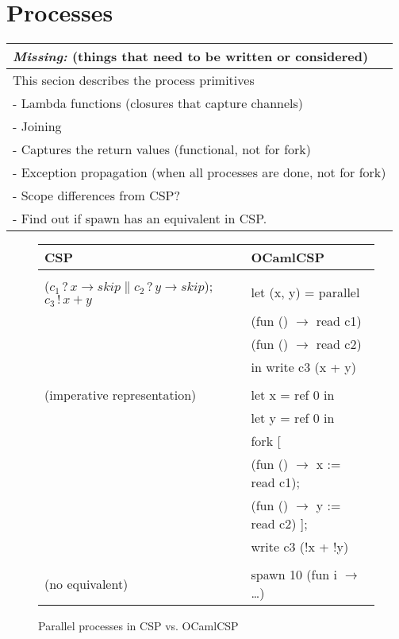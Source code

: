 \documentclass[11pt,oneside,a4paper]{article}
\newcommand{\missing}[1]{
\begin{tabular}{|p{11cm}|}
\hline
\emph{Missing:} {\scriptsize (things that need to be written or considered)} \\
\hline
#1
\hline
\end{tabular}
}
\begin{document}
\section{Processes}
\missing{
This secion describes the process primitives \\
- Lambda functions (closures that capture channels) \\
- Joining \\
- Captures the return values (functional, not for fork) \\
- Exception propagation (when all processes are done, not for fork) \\
- Scope differences from CSP? \\
- Find out if spawn has an equivalent in CSP. \\
}

\begin{figure}[h]
\centering
\begin{tabular}{l|l}
CSP & OCamlCSP \\
\hline
& \\
($c_1\,?\,x \to skip \parallel c_2\,?\,y \to skip$); $c_3\,!\,x + y$ & let (x, y) = parallel \\
& \quad (fun () $\to$ read c1) \\
& \quad (fun () $\to$ read c2) \\
& in write c3 (x + y) \\
& \\
(imperative representation) & let x = ref 0 in \\
& let y = ref 0 in \\
& fork [ \\
& \quad (fun () $\to$ x := read c1); \\
& \quad (fun () $\to$ y := read c2) ]; \\
& write c3 (!x + !y) \\
& \\
(no equivalent) & spawn 10 (fun i $\to$ \dots) \\
\end{tabular}
\caption{Parallel processes in CSP vs. OCamlCSP}
\label{channel-parallel}
\end{figure}
\end{document}
